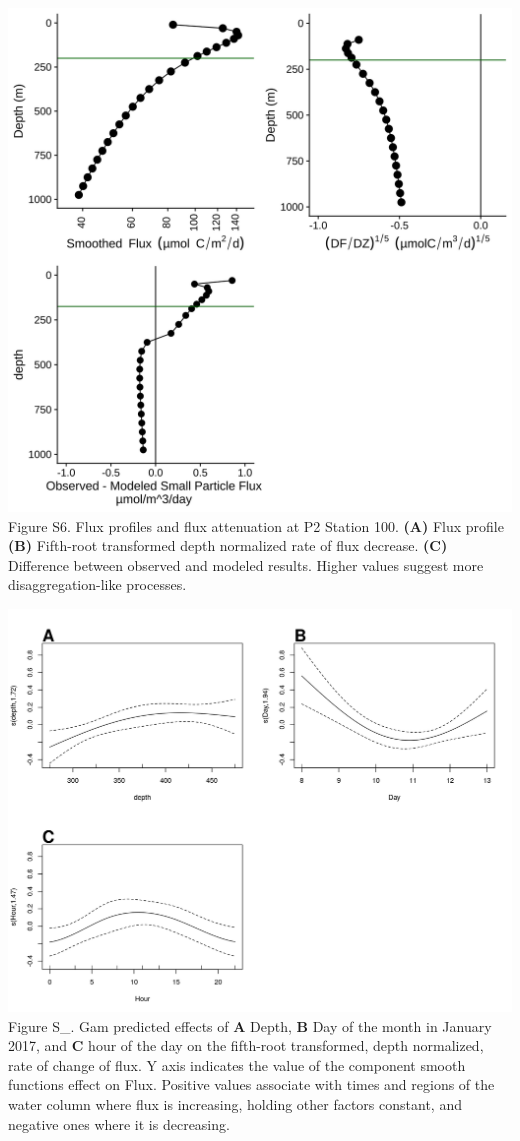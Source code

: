 \documentclass[]{article}
\begin{document}
\includegraphics{../figures/P16FluxRelate.svg} Figure S6. Flux profiles
and flux attenuation at P2 Station 100. \textbf{(A)} Flux profile
\textbf{(B)} Fifth-root transformed depth normalized rate of flux
decrease. \textbf{(C)} Difference between observed and modeled results.
Higher values suggest more disaggregation-like processes.

\includegraphics{../figures/FluxGamPlot.png} Figure S\_. Gam predicted
effects of \textbf{A} Depth, \textbf{B} Day of the month in January
2017, and \textbf{C} hour of the day on the fifth-root transformed,
depth normalized, rate of change of flux. Y axis indicates the value of
the component smooth functions effect on Flux. Positive values associate
with times and regions of the water column where flux is increasing,
holding other factors constant, and negative ones where it is
decreasing.
\end{document}
